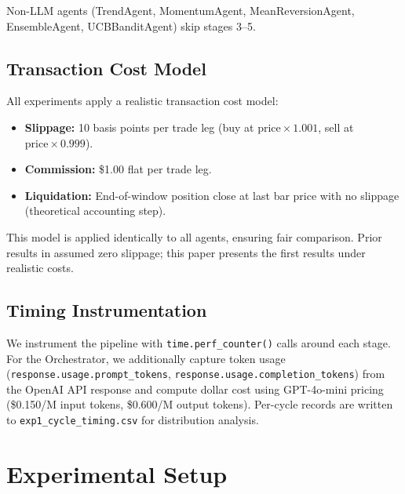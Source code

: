 \documentclass[10pt,conference]{IEEEtran}
\begin{document}
Non-LLM agents (TrendAgent, MomentumAgent, MeanReversionAgent, EnsembleAgent, UCBBanditAgent) skip stages 3--5.

\subsection{Transaction Cost Model}

All experiments apply a realistic transaction cost model:
\begin{itemize}
    \item \textbf{Slippage:} 10 basis points per trade leg (buy at $\text{price} \times 1.001$, sell at $\text{price} \times 0.999$).
    \item \textbf{Commission:} \$1.00 flat per trade leg.
    \item \textbf{Liquidation:} End-of-window position close at last bar price with no slippage (theoretical accounting step).
\end{itemize}

This model is applied identically to all agents, ensuring fair comparison. Prior results in \cite{companion} assumed zero slippage; this paper presents the first results under realistic costs.

\subsection{Timing Instrumentation}

We instrument the pipeline with \texttt{time.perf\_counter()} calls around each stage. For the Orchestrator, we additionally capture token usage (\texttt{response.usage.prompt\_tokens}, \texttt{response.usage.completion\_tokens}) from the OpenAI API response and compute dollar cost using GPT-4o-mini pricing (\$0.150/M input tokens, \$0.600/M output tokens). Per-cycle records are written to \texttt{exp1\_cycle\_timing.csv} for distribution analysis.


\section{Experimental Setup}
\end{document}
